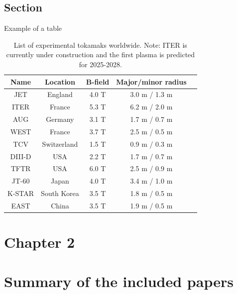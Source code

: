 \documentclass[electronic]{kthesis}
\begin{document}
\section{Section}
Example of a table
\begin{table}[t!]
	\centering
	\caption{List of experimental tokamaks worldwide. Note: ITER is currently under construction and the first plasma is predicted for 2025-2028.}
		\begin{tabular}{ccccc}
			\hline
			\textbf{Name} & \textbf{Location} & \textbf{B-field} & \textbf{Major/minor radius}  \\
			\hline
			JET     & England      & 4.0 T & 3.0 m / 1.3 m \\
			ITER    & France       & 5.3 T & 6.2 m / 2.0 m \\
			AUG		& Germany      & 3.1 T & 1.7 m / 0.7 m \\
			WEST	& France	   & 3.7 T & 2.5 m / 0.5 m \\
			TCV     & Switzerland  & 1.5 T & 0.9 m / 0.3 m \\
			DIII-D  & USA          & 2.2 T & 1.7 m / 0.7 m \\
			TFTR 	& USA          & 6.0 T & 2.5 m / 0.9 m \\
			JT-60   & Japan        & 4.0 T & 3.4 m / 1.0 m \\
			K-STAR  & South Korea  & 3.5 T & 1.8 m / 0.5 m \\
			EAST    & China        & 3.5 T & 1.9 m / 0.5 m \\
			\hline
		\end{tabular}
	\label{TokamakTable}
\end{table}


\chapter{Chapter 2}
\label{Ch2label}
\noindent \lipsum[1]

\chapter{Summary of the included papers}
\label{Summary}
\noindent \lipsum[1]
\end{document}
